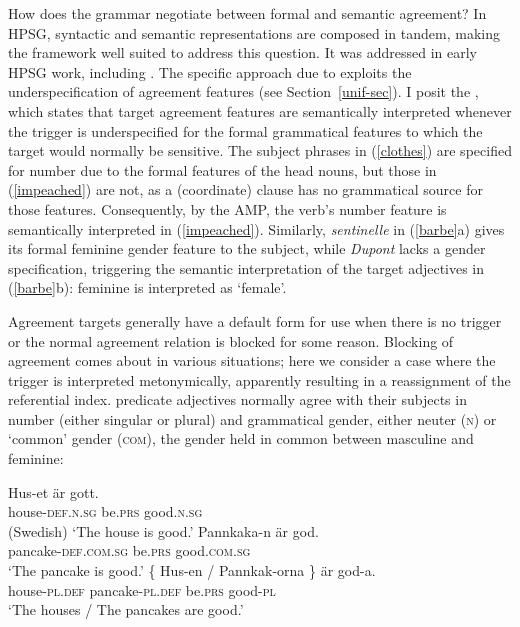 \documentclass[output=paper
 	        ,biblatex
                ,babelshorthands
                ,newtxmath
                ,draftmode
                ,colorlinks, citecolor=brown
]{langscibook}
\begin{document}
How does the grammar negotiate between formal and semantic agreement?  In HPSG, syntactic and semantic representations are composed in tandem, making the framework well suited to address this question.   It was addressed in early HPSG work, including .   The specific approach due to  exploits the underspecification of agreement features (see Section~\ref{unif-sec}).  I posit the , which states that target agreement features are semantically interpreted whenever the trigger is underspecified for the formal grammatical features to which the target would normally be sensitive.   The subject phrases in (\ref{clothes}) are specified for number due to the formal features of the head nouns, but those in (\ref{impeached}) are not, as a (coordinate) clause has no grammatical source for those features.  Consequently, by the AMP, the verb's number feature is semantically interpreted in (\ref{impeached}).  Similarly, \textit{sentinelle} in (\ref{barbe}a) gives its formal feminine gender feature to the subject, while \textit{Dupont} lacks a gender specification, triggering the semantic interpretation of the target adjectives in (\ref{barbe}b): feminine is interpreted as `female'.    

Agreement targets generally have a default form for use when there is no trigger or the normal agreement relation is blocked for some reason.   
Blocking of agreement comes about in various situations; here we  consider a case where the trigger is interpreted metonymically,  apparently resulting in a reassignment of the referential index.   predicate adjectives normally agree with their subjects in number (either singular or plural) and grammatical gender, either neuter (\textsc{n}) or `common' gender (\textsc{com}), the gender held in common between masculine and feminine: 

\begin{exe} 
\ex \label{huset}
 \begin{xlist}
\ex 
\gll Hus-et 	är	gott. \\
     house-\textsc{def.n.sg}	be.\textsc{prs}	good.\textsc{n.sg} \\\hfill(Swedish)
\glt	`The house is good.’
\ex   
\gll Pannkaka-n 	         är	         god. \\
     pancake-\textsc{def.com.sg} be.\textsc{prs} good.\textsc{com.sg} \\
\glt	`The pancake is good.’
\ex   
\gll   \{   Hus-en / Pannkak-orna 	\}	är	god-a. \\
	   {}   house-\textsc{pl.def} {} pancake-\textsc{pl.def} {} be.\textsc{prs} good-\textsc{pl}  \\
\glt	`The houses / The pancakes are good.’
\end{xlist}
\end{exe}
\end{document}
